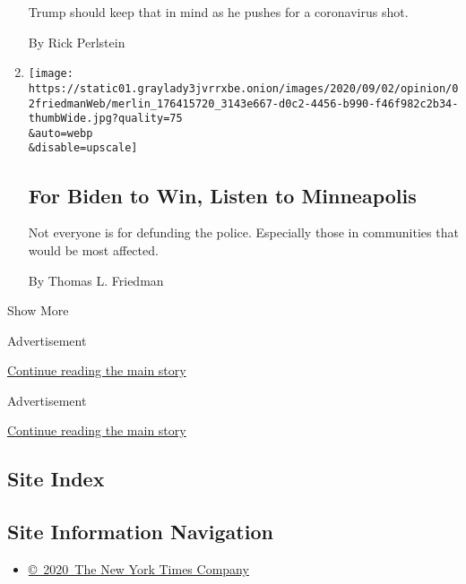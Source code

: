 \begin{enumerate}
  Trump should keep that in mind as he pushes for a coronavirus shot.

  By Rick Perlstein
\item
  \href{/2020/09/01/opinion/biden-trump-police-minneapolis.html}{}

  \texttt{[image: https://static01.graylady3jvrrxbe.onion/images/2020/09/02/opinion/02friedmanWeb/merlin\_176415720\_3143e667-d0c2-4456-b990-f46f982c2b34-thumbWide.jpg?quality=75\\\&auto=webp\\\&disable=upscale]}

  \hypertarget{for-biden-to-win-listen-to-minneapolis}{%
  \subsection{For Biden to Win, Listen to
  Minneapolis}\label{for-biden-to-win-listen-to-minneapolis}}

  Not everyone is for defunding the police. Especially those in
  communities that would be most affected.

  By Thomas L. Friedman
\end{enumerate}

Show More

Advertisement

\protect\hyperlink{after-mid2}{Continue reading the main story}

Advertisement

\protect\hyperlink{after-mktg}{Continue reading the main story}

\hypertarget{site-index}{%
\subsection{Site Index}\label{site-index}}

\hypertarget{site-information-navigation}{%
\subsection{Site Information
Navigation}\label{site-information-navigation}}

\begin{itemize}
\tightlist
\item
  \href{https://help.nytimes3xbfgragh.onion/hc/en-us/articles/115014792127-Copyright-notice}{©~2020~The
  New York Times Company}
\end{itemize}

